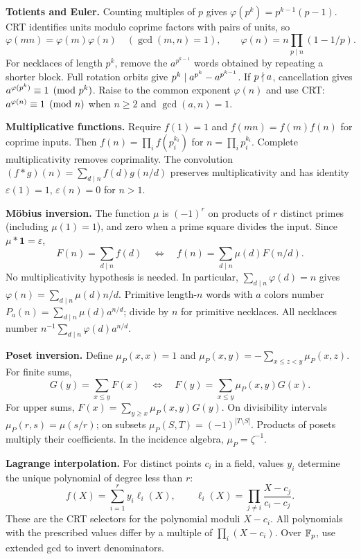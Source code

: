 \textbf{Totients and Euler.} Counting multiples of $p$ gives
$\varphi(p^k)=p^{k-1}(p-1)$. CRT identifies units modulo coprime
factors with pairs of units, so
\[
 \varphi(mn)=\varphi(m)\varphi(n)\quad(\gcd(m,n)=1),\qquad
 \varphi(n)=n\prod_{p\mid n}(1-1/p).
\]
For necklaces of length $p^k$, remove the $a^{p^{k-1}}$ words
obtained by repeating a shorter block. Full rotation orbits give
$p^k\mid a^{p^k}-a^{p^{k-1}}$. If $p\nmid a$, cancellation
gives $a^{\varphi(p^k)}\equiv1\pmod{p^k}$.
Raise to the common exponent $\varphi(n)$ and use CRT:
$a^{\varphi(n)}\equiv1\pmod n$ when $n\ge2$ and $\gcd(a,n)=1$.

\textbf{Multiplicative functions.} Require $f(1)=1$ and
$f(mn)=f(m)f(n)$ for coprime inputs. Then
$f(n)=\prod_i f(p_i^{k_i})$ for $n=\prod_i p_i^{k_i}$.
Complete multiplicativity removes coprimality.
The convolution $(f*g)(n)=\sum_{d\mid n}f(d)g(n/d)$ preserves
multiplicativity and has identity $\varepsilon(1)=1$,
$\varepsilon(n)=0$ for $n>1$.

\textbf{M\"obius inversion.} The function $\mu$ is $(-1)^r$ on
products of $r$ distinct primes (including $\mu(1)=1$), and zero
when a prime square divides the input. Since $\mu*\mathbf{1}=\varepsilon$,
\[
 F(n)=\sum_{d\mid n}f(d)
 \quad\Longleftrightarrow\quad
 f(n)=\sum_{d\mid n}\mu(d)F(n/d).
\]
No multiplicativity hypothesis is needed.
In particular, $\sum_{d\mid n}\varphi(d)=n$ gives
$\varphi(n)=\sum_{d\mid n}\mu(d)n/d$.
Primitive length-$n$ words with $a$ colors number
$P_a(n)=\sum_{d\mid n}\mu(d)a^{n/d}$; divide by $n$ for primitive
necklaces. All necklaces number $n^{-1}\sum_{d\mid n}\varphi(d)a^{n/d}$.

\textbf{Poset inversion.} Define $\mu_P(x,x)=1$ and
$\mu_P(x,y)=-\sum_{x\le z<y}\mu_P(x,z)$. For finite sums,
\[
 G(y)=\sum_{x\le y}F(x)
 \quad\Longleftrightarrow\quad
 F(y)=\sum_{x\le y}\mu_P(x,y)G(x).
\]
For upper sums, $F(x)=\sum_{y\ge x}\mu_P(x,y)G(y)$.
On divisibility intervals $\mu_P(r,s)=\mu(s/r)$; on subsets
$\mu_P(S,T)=(-1)^{|T\setminus S|}$. Products of posets multiply
their coefficients. In the incidence algebra, $\mu_P=\zeta^{-1}$.

\textbf{Lagrange interpolation.} For distinct points $c_i$ in a field,
values $y_i$ determine the unique polynomial of degree less than $r$:
\[
 f(X)=\sum_{i=1}^r y_i\ell_i(X),\qquad
 \ell_i(X)=\prod_{j\ne i}\frac{X-c_j}{c_i-c_j}.
\]
These are the CRT selectors for the polynomial moduli $X-c_i$.
All polynomials with the prescribed values differ by a multiple of
$\prod_i(X-c_i)$. Over $\mathbb F_p$, use extended gcd to invert denominators.

